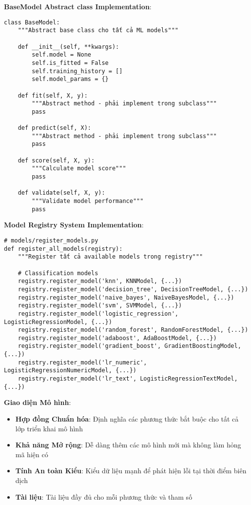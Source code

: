 \textbf{BaseModel Abstract class Implementation}:

\begin{verbatim}
class BaseModel:
    """Abstract base class cho tất cả ML models"""
    
    def __init__(self, **kwargs):
        self.model = None
        self.is_fitted = False
        self.training_history = []
        self.model_params = {}
        
    def fit(self, X, y):
        """Abstract method - phải implement trong subclass"""
        pass
        
    def predict(self, X):
        """Abstract method - phải implement trong subclass"""
        pass
        
    def score(self, X, y):
        """Calculate model score"""
        pass
        
    def validate(self, X, y):
        """Validate model performance"""
        pass
\end{verbatim}

\textbf{Model Registry System Implementation}:

\begin{verbatim}
# models/register_models.py
def register_all_models(registry):
    """Register tất cả available models trong registry"""
    
    # Classification models  
    registry.register_model('knn', KNNModel, {...})
    registry.register_model('decision_tree', DecisionTreeModel, {...})
    registry.register_model('naive_bayes', NaiveBayesModel, {...})
    registry.register_model('svm', SVMModel, {...})
    registry.register_model('logistic_regression', LogisticRegressionModel, {...})
    registry.register_model('random_forest', RandomForestModel, {...})
    registry.register_model('adaboost', AdaBoostModel, {...})
    registry.register_model('gradient_boost', GradientBoostingModel, {...})
    registry.register_model('lr_numeric', LogisticRegressionNumericModel, {...})
    registry.register_model('lr_text', LogisticRegressionTextModel, {...})
\end{verbatim}

\textbf{Giao diện Mô hình}:
        \begin{itemize}
    \item \textbf{Hợp đồng Chuẩn hóa}: Định nghĩa các phương thức bắt buộc cho tất cả lớp triển khai mô hình
    \item \textbf{Khả năng Mở rộng}: Dễ dàng thêm các mô hình mới mà không làm hỏng mã hiện có
    \item \textbf{Tính An toàn Kiểu}: Kiểu dữ liệu mạnh để phát hiện lỗi tại thời điểm biên dịch
    \item \textbf{Tài liệu}: Tài liệu đầy đủ cho mỗi phương thức và tham số
        \end{itemize}

